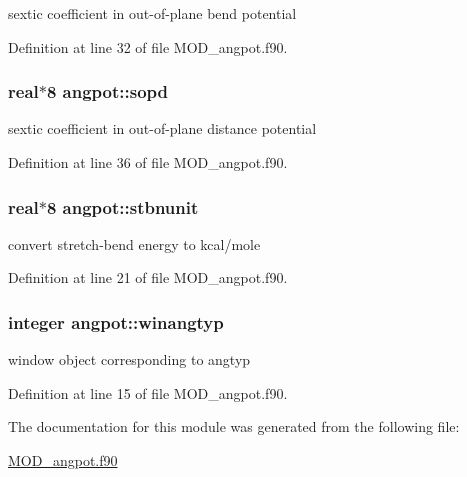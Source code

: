 sextic coefficient in out-\/of-\/plane bend potential 



Definition at line 32 of file M\-O\-D\-\_\-angpot.\-f90.

\hypertarget{classangpot_af3dd83fc43152e637659439b3b568f8c}{
\subsubsection[{sopd}]{\setlength{\rightskip}{0pt plus 5cm}real$\ast$8 angpot\-::sopd}}\label{classangpot_af3dd83fc43152e637659439b3b568f8c}


sextic coefficient in out-\/of-\/plane distance potential 



Definition at line 36 of file M\-O\-D\-\_\-angpot.\-f90.

\hypertarget{classangpot_a8f4817c26ee799292dc6dc788cc83453}{
\subsubsection[{stbnunit}]{\setlength{\rightskip}{0pt plus 5cm}real$\ast$8 angpot\-::stbnunit}}\label{classangpot_a8f4817c26ee799292dc6dc788cc83453}


convert stretch-\/bend energy to kcal/mole 



Definition at line 21 of file M\-O\-D\-\_\-angpot.\-f90.

\hypertarget{classangpot_a4b84260ef5a4a0d7f4064fe36437910b}{
\subsubsection[{winangtyp}]{\setlength{\rightskip}{0pt plus 5cm}integer angpot\-::winangtyp}}\label{classangpot_a4b84260ef5a4a0d7f4064fe36437910b}


window object corresponding to angtyp 



Definition at line 15 of file M\-O\-D\-\_\-angpot.\-f90.



The documentation for this module was generated from the following file\-:\begin{DoxyCompactItemize}
\item 
\hyperlink{MOD__angpot_8f90}{M\-O\-D\-\_\-angpot.\-f90}\end{DoxyCompactItemize}

